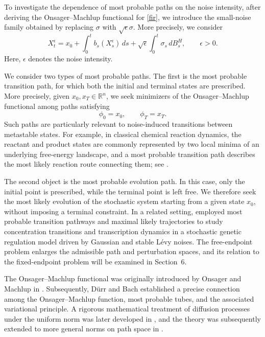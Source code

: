 \documentclass[preprint,12pt]{elsarticle}
\theoremstyle{definition}
\theoremstyle{plain}
\begin{document}
    To investigate the dependence of most probable paths on the noise
intensity, after deriving the Onsager--Machlup functional for
\eqref{fir}, we introduce the small-noise family obtained by replacing
$\sigma$ with $\sqrt{\epsilon}\sigma$. More precisely, we consider
\begin{equation*}
    X_t^\epsilon
    =
    x_0
    +
    \int_0^t b_s(X_s^\epsilon)\,ds
    +
    \sqrt{\epsilon}
    \int_0^t\sigma_s\,dB_s^H,
    \qquad
    \epsilon>0.
\end{equation*}
Here, $\epsilon$ denotes the noise intensity. 

We consider two types of most probable paths. The first is the most probable
transition path, for which both the initial and terminal states are prescribed.
More precisely, given $x_0,x_T\in\mathbb R^n$, we seek minimizers of the
Onsager--Machlup functional among paths satisfying
\begin{equation*}
\phi_0=x_0,
\qquad
\phi_T=x_T.
\end{equation*}
Such paths are particularly relevant to noise-induced transitions between
metastable states. For example, in classical chemical reaction dynamics, the
reactant and product states are commonly represented by two local minima of an
underlying free-energy landscape, and a most probable transition path
describes the most likely reaction route connecting them; see
\cite{pinski2010transition}.

The second object is the most probable evolution path. In this case, only the
initial point is prescribed, while the terminal point is left free. We
therefore seek the most likely evolution of the stochastic system starting
from a given state $x_0$, without imposing a terminal constraint. In a related
setting, \cite{CHENG2019121779} employed most probable transition pathways and
maximal likely trajectories to study concentration transitions and
transcription dynamics in a stochastic genetic regulation model driven by
Gaussian and stable L\'evy noises. The free-endpoint problem enlarges the
admissible path and perturbation spaces, and its relation to the
fixed-endpoint problem will be examined in Section~6.


The Onsager--Machlup functional was originally introduced by Onsager and
Machlup in \cite{Onsager1953}. Subsequently, D\"urr and Bach
\cite{durr1978onsager} established a precise connection among the
Onsager--Machlup function, most probable tubes, and the associated variational
principle. A rigorous mathematical treatment of diffusion processes under the
uniform norm was later developed in \cite{ikeda1981stochastic}, and the theory
was subsequently extended to more general norms on path space in
\cite{Shepp1992,Capitaine1995}.
\end{document}
